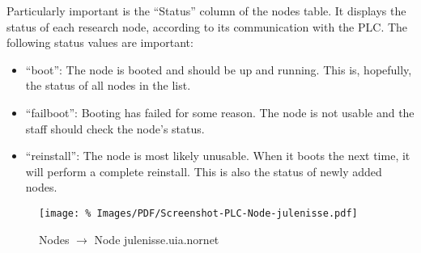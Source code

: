 Particularly important is the ``Status'' column of the nodes table. It displays the status of each research node, according to its communication with the PLC. The following status values are important:
\begin{itemize}
 \item ``boot'': The node is booted and should be up and running. This is, hopefully, the status of all nodes in the list.
 \item ``failboot'': Booting has failed for some reason. The node is not usable and the  staff should check the node's status.
 \item ``reinstall'': The node is most likely unusable. When it boots the next time, it will perform a complete reinstall. This is also the status of newly added nodes.
\end{itemize}


\begin{figure*}
\begin{center}
\texttt{[image: \%
   Images/PDF/Screenshot-PLC-Node-julenisse.pdf]}
\end{center}
\caption{Nodes $\rightarrow$ Node julenisse.uia.nornet}
\label{cap:PLC-Node-Details}
\end{figure*}

